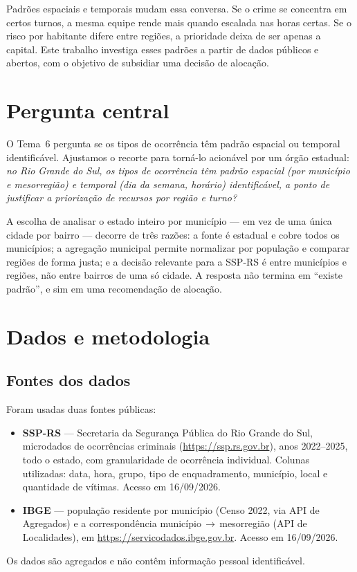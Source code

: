 \documentclass[a4paper,11pt]{article}
\begin{document}
Padrões espaciais e temporais mudam essa conversa. Se o crime se concentra em
certos turnos, a mesma equipe rende mais quando escalada nas horas certas. Se o
risco por habitante difere entre regiões, a prioridade deixa de ser apenas a
capital. Este trabalho investiga esses padrões a partir de dados públicos e
abertos, com o objetivo de subsidiar uma decisão de alocação.

\section{Pergunta central}\label{sec:pergunta}
O Tema~6 pergunta se os tipos de ocorrência têm padrão espacial ou temporal
identificável. Ajustamos o recorte para torná-lo acionável por um órgão
estadual: \emph{no Rio Grande do Sul, os tipos de ocorrência têm padrão espacial
(por município e mesorregião) e temporal (dia da semana, horário) identificável,
a ponto de justificar a priorização de recursos por região e turno?}

A escolha de analisar o estado inteiro por município --- em vez de uma única
cidade por bairro --- decorre de três razões: a fonte é estadual e cobre todos os
municípios; a agregação municipal permite normalizar por população e comparar
regiões de forma justa; e a decisão relevante para a SSP-RS é entre municípios e
regiões, não entre bairros de uma só cidade. A resposta não termina em
``existe padrão'', e sim em uma recomendação de alocação.

\section{Dados e metodologia}\label{sec:metodo}

\subsection{Fontes dos dados}
Foram usadas duas fontes públicas:
\begin{itemize}[nosep]
  \item \textbf{SSP-RS} --- Secretaria da Segurança Pública do Rio Grande do Sul,
  microdados de ocorrências criminais (\url{https://ssp.rs.gov.br}), anos
  2022--2025, todo o estado, com granularidade de ocorrência individual. Colunas
  utilizadas: data, hora, grupo, tipo de enquadramento, município, local e
  quantidade de vítimas. Acesso em 16/09/2026.
  \item \textbf{IBGE} --- população residente por município (Censo 2022, via API
  de Agregados) e a correspondência município\,$\rightarrow$\,mesorregião (API de
  Localidades), em \url{https://servicodados.ibge.gov.br}. Acesso em 16/09/2026.
\end{itemize}
Os dados são agregados e não contêm informação pessoal identificável.
\end{document}
